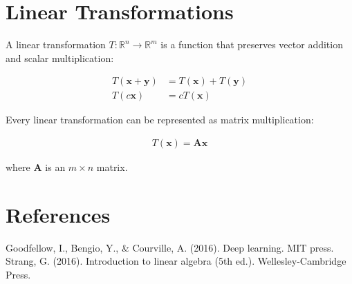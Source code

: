 \documentclass[12pt]{article}
\begin{document}
\section{Linear Transformations}

A linear transformation $T: \mathbb{R}^n \rightarrow \mathbb{R}^m$ is a function that preserves vector addition and scalar multiplication:

\begin{align}
T(\mathbf{x} + \mathbf{y}) &= T(\mathbf{x}) + T(\mathbf{y}) \\
T(c\mathbf{x}) &= cT(\mathbf{x})
\end{align}

Every linear transformation can be represented as matrix multiplication:

\begin{align}
T(\mathbf{x}) = \mathbf{A}\mathbf{x}
\end{align}

where $\mathbf{A}$ is an $m \times n$ matrix.

\section{References}

\begin{thebibliography}{9}
 Goodfellow, I., Bengio, Y., \& Courville, A. (2016). Deep learning. MIT press.
 Strang, G. (2016). Introduction to linear algebra (5th ed.). Wellesley-Cambridge Press.
\end{thebibliography}
\end{document}
